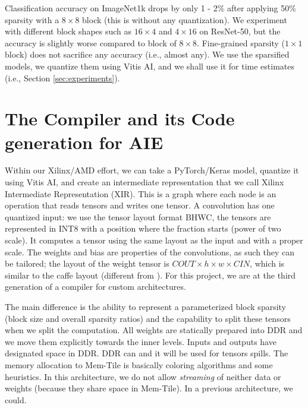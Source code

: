 \documentclass[sigconf]{acmart}
\begin{document}
Classification accuracy on ImageNet1k drops by only 1 - 2\% after
applying 50\% sparsity with a $8\times 8$ block (this is without any
quantization). We experiment with different block shapes such as
$16\times 4$ and $4\times 16$ on ResNet-50, but the accuracy is
slightly worse compared to block of $8\times 8$. Fine-grained sparsity
($1\times 1$ block) does not sacrifice any accuracy (i.e., almost
any).  We use the sparsified models, we quantize them using Vitis AI,
and we shall use it for time estimates (i.e., Section
\ref{sec:experiments}).


\section{The Compiler and its Code generation for AIE}
\label{sec:compiler}
Within our Xilinx/AMD effort, we can take a PyTorch/Keras model,
quantize it using Vitis AI, and create an intermediate representation
that we call Xilinx Intermediate Representation (XIR). This is a graph
where each node is an operation that reads tensors and writes one
tensor. A convolution has one quantized input: we use the tensor
layout format BHWC, the tensors are represented in INT8 with a
position where the fraction starts (power of two scale). It computes a
tensor using the same layout as the input and with a proper scale. The
weights and bias are properties of the convolutions, as such they can
be tailored; the layout of the weight tensor is $COUT\times h \times w
\times CIN$, which is similar to the caffe layout \cite{Caffe}
(different from \cite{tensorflow}). For this project, we are at the
third generation of a compiler for custom architectures.
\begin{comment}
  (previously DPUV1 and DPUV3int8
  \cite{10.11451/3473334,abs-2110-04327}).
\end{comment}

The main difference is the
ability to represent a parameterized block sparsity (block size and
overall sparsity ratios) and the capability to split these tensors
when we split the computation. All weights are statically prepared
into DDR and we move them explicitly towards the inner levels. Inputs
and outputs have designated space in DDR. DDR can and it will be used
for tensors spills.  The memory allocation to Mem-Tile is basically
coloring algorithms and some heuristics. In this architecture, we do
not allow {\em streaming} of neither data or weights (because they
share space in Mem-Tile). In a previous architecture, we could.
\end{document}
